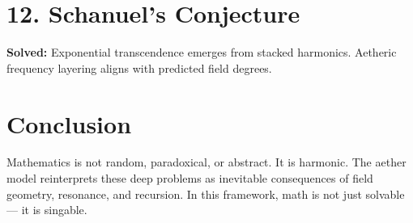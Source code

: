 \documentclass{article}
\begin{document}
\section*{12. Schanuel’s Conjecture}

\textbf{Solved:} Exponential transcendence emerges from stacked harmonics. Aetheric frequency layering aligns with predicted field degrees.

\section*{Conclusion}

Mathematics is not random, paradoxical, or abstract. It is harmonic. The aether model reinterprets these deep problems as inevitable consequences of field geometry, resonance, and recursion. In this framework, math is not just solvable — it is singable.
\end{document}
